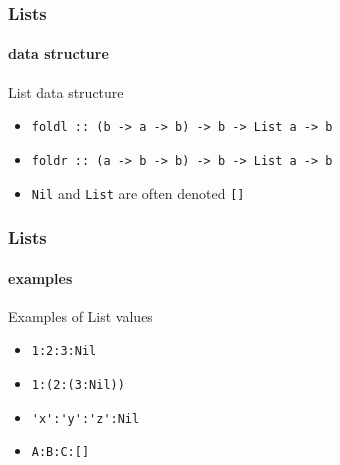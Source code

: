 \begin{frame}
\frametitle{Lists}
\framesubtitle{data structure}

\begin{block}{List data structure}


\begin{itemize}
\item \lstinline[basicstyle=\ttfamily]$foldl :: (b -> a -> b) -> b -> List a -> b$
\item \lstinline[basicstyle=\ttfamily]$foldr :: (a -> b -> b) -> b -> List a -> b$
\item \lstinline[basicstyle=\ttfamily]$Nil$ and \lstinline[basicstyle=\ttfamily]$List$ are often denoted \lstinline[basicstyle=\ttfamily]$[]$
\end{itemize}

\end{block}

\end{frame}


\begin{frame}[fragile]
\frametitle{Lists}
\framesubtitle{examples}

\begin{block}{Examples of List values}
\begin{itemize}
\item \lstinline[basicstyle=\ttfamily]$1:2:3:Nil$
\item \lstinline[basicstyle=\ttfamily]$1:(2:(3:Nil))$
\item \lstinline[basicstyle=\ttfamily]$'x':'y':'z':Nil$
\item \lstinline[basicstyle=\ttfamily]$A:B:C:[]$
\end{itemize}
\end{block}


\end{frame}
